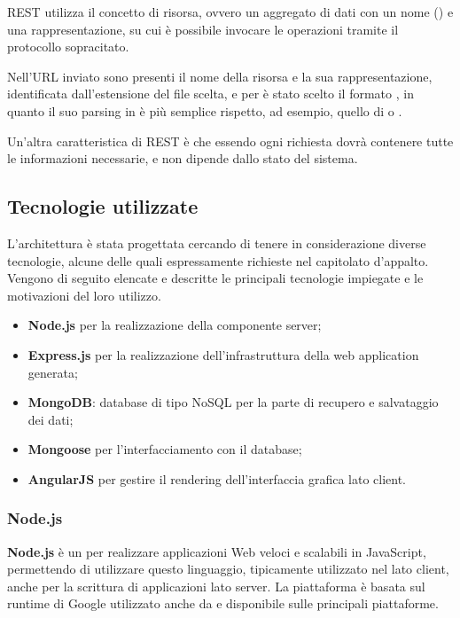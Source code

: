 REST utilizza il concetto di risorsa, ovvero un aggregato di dati con un nome () e una rappresentazione, su cui è possibile invocare le operazioni  tramite il protocollo sopracitato.

Nell'URL inviato sono presenti il nome della risorsa e la sua rappresentazione, identificata dall'estensione del file scelta, e per \ProjectName è stato scelto il formato , in quanto il suo parsing in  è più semplice rispetto, ad esempio, quello di  o .

Un'altra caratteristica di REST è che essendo  ogni richiesta dovrà contenere tutte le informazioni necessarie, e non dipende dallo stato del sistema.

\subsection{Tecnologie utilizzate}
L'architettura è stata progettata cercando di tenere in considerazione diverse tecnologie, alcune delle quali espressamente richieste nel capitolato d'appalto. Vengono di seguito elencate e descritte le principali tecnologie impiegate e le motivazioni del loro utilizzo.

\begin{itemize}
	\item \textbf{Node.js} per la realizzazione della componente server;
	\item \textbf{Express.js} per la realizzazione dell’infrastruttura della web application generata;
	\item \textbf{MongoDB}: database di tipo NoSQL per la parte di recupero e salvataggio dei dati;
	\item \textbf{Mongoose} per l’interfacciamento con il database;
	\item \textbf{AngularJS} per gestire il rendering dell'interfaccia grafica lato client.
\end{itemize}


\subsubsection{Node.js}
\textbf{Node.js} è un  per realizzare applicazioni Web veloci e scalabili in JavaScript, permettendo di utilizzare questo linguaggio, tipicamente utilizzato nel lato client, anche per la scrittura di applicazioni lato server.
La piattaforma è basata sul runtime di Google  utilizzato anche da  e disponibile sulle principali piattaforme.

